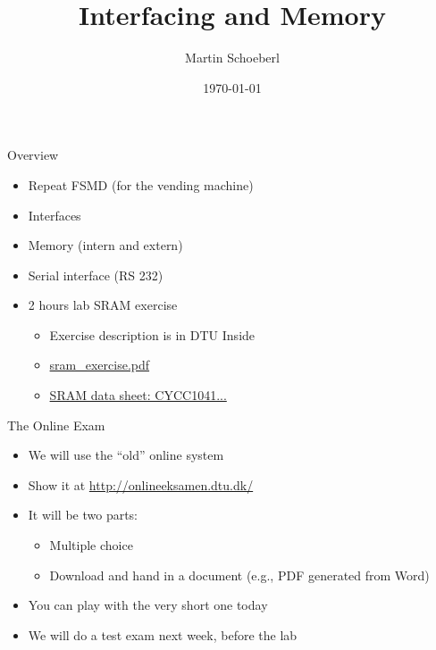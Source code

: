 

\newif\ifbook


\title{Interfacing and Memory}
\author{Martin Schoeberl}
\date{\today}



\begin{frame}
\titlepage
\end{frame}


\begin{frame}[fragile]{Overview}
\begin{itemize}
\item Repeat FSMD (for the vending machine)
\item Interfaces
\item Memory (intern and extern)
\item Serial interface (RS 232)
\item 2 hours lab SRAM exercise
\begin{itemize}
\item Exercise description is in DTU Inside
\item \href{https://cn.inside.dtu.dk/cnnet/filesharing/download/39a98e6a-f453-4aa7-98c4-cb13eae6c805}{sram\_exercise.pdf}
\item \href{https://cn.inside.dtu.dk/cnnet/filesharing/download/618360ca-01b4-42e4-86e2-765835963deb}{SRAM data sheet: CYCC1041...}
\end{itemize}
\end{itemize}
\end{frame}


\begin{frame}[fragile]{The Online Exam}
\begin{itemize}
\item We will use the ``old'' online system
\item Show it at \url{http://onlineeksamen.dtu.dk/}
\item It will be two parts:
\begin{itemize}
\item Multiple choice
\item Download and hand in a document (e.g., PDF generated from Word)
\end{itemize}
\item You can play with the very short one today
\item We will do a test exam next week, before the lab
\end{itemize}
\end{frame}

